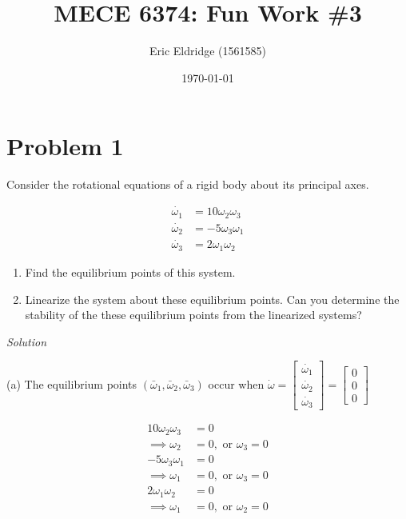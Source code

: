\documentclass{article}
\title{MECE 6374: Fun Work \#3}
\date{\today}
\author{Eric Eldridge (1561585)}
\begin{document}

  \maketitle

  \section{Problem 1}

  Consider the rotational equations of a rigid body about its principal axes.

  \begin{align*}
    \dot{\omega_1} &= 10\omega_2\omega_3 \\
    \dot{\omega_2} &= -5\omega_3\omega_1 \\
    \dot{\omega_3} &= 2\omega_1\omega_2
  \end{align*}

  \begin{enumerate}[label=(\alph*)]
    \item Find the equilibrium points of this system.
    \item Linearize the system about these equilibrium points. Can you determine
      the stability of the these equilibrium points from the linearized systems?
  \end{enumerate} 
    
  \vspace{3mm}
  \noindent \textit{Solution} \newline 

  \indent (a) The equilibrium points $(\bar{\omega}_1, \bar{\omega}_2,
  \bar{\omega}_3)$ occur when
  $\dot{\omega} =
  \begin{bmatrix}
      \dot{\omega_1} \\
      \dot{\omega_2} \\
      \dot{\omega_3}
  \end{bmatrix} =
  \begin{bmatrix}
      0 \\
      0 \\
      0
  \end{bmatrix} $

  \begin{align*}
    10\omega_2\omega_3 &= 0 \\
    \implies \omega_2 &= 0, \text{ or } \omega_3 = 0 \\
    -5\omega_3\omega_1 &= 0 \\
    \implies \omega_1 &= 0, \text{ or } \omega_3 = 0 \\
    2\omega_1\omega_2 &= 0 \\
    \implies \omega_1 &= 0, \text{ or } \omega_2 = 0 \\
  \end{align*}
\end{document}
